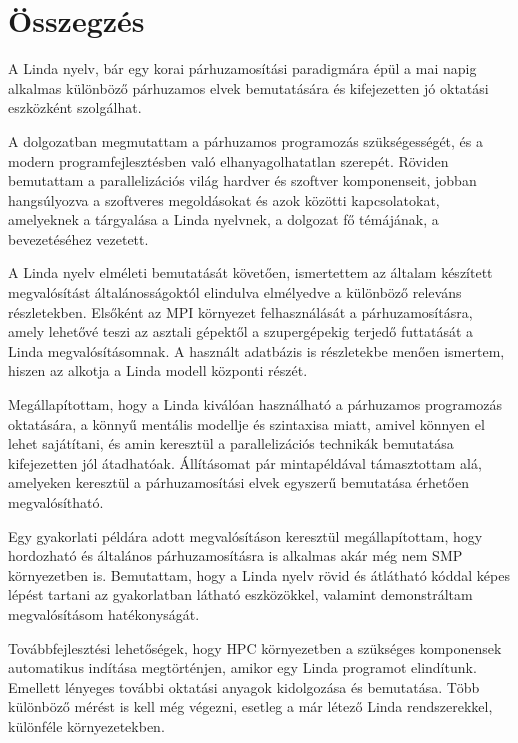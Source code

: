 
\chapter*{Összegzés}

A Linda nyelv, bár egy korai párhuzamosítási paradigmára épül a mai napig alkalmas különböző párhuzamos elvek bemutatására és kifejezetten jó oktatási eszközként szolgálhat.

A dolgozatban megmutattam a párhuzamos programozás szükségességét, és a modern programfejlesztésben való elhanyagolhatatlan szerepét.
Röviden bemutattam a parallelizációs világ hardver és szoftver komponenseit, jobban hangsúlyozva a szoftveres megoldásokat és azok közötti kapcsolatokat, amelyeknek a tárgyalása a Linda nyelvnek, a dolgozat fő témájának, a bevezetéséhez vezetett.

A Linda nyelv elméleti bemutatását követően, ismertettem az általam készített megvalósítást általánosságoktól elindulva elmélyedve a különböző releváns részletekben.
Elsőként az \ac{MPI} környezet felhasználását a párhuzamosításra, amely lehetővé teszi az asztali gépektől a szupergépekig terjedő futtatását a Linda megvalósításomnak.
A használt adatbázis is részletekbe menően ismertem, hiszen az alkotja a Linda modell központi részét.

Megállapítottam, hogy a Linda kiválóan használható a párhuzamos programozás oktatására, a könnyű mentális modellje és szintaxisa miatt, amivel könnyen el lehet sajátítani, és amin keresztül a parallelizációs technikák bemutatása kifejezetten jól átadhatóak.
Állításomat pár mintapéldával támasztottam alá, amelyeken keresztül a párhuzamosítási elvek egyszerű bemutatása érhetően megvalósítható.

Egy gyakorlati példára adott megvalósításon keresztül megállapítottam, hogy hordozható és általános párhuzamosításra is alkalmas akár még nem \ac{SMP} környezetben is.
Bemutattam, hogy a Linda nyelv rövid és átlátható kóddal képes lépést tartani az gyakorlatban látható eszközökkel, valamint demonstráltam megvalósításom hatékonyságát.

Továbbfejlesztési lehetőségek, hogy \ac{HPC} környezetben a szükséges komponensek automatikus indítása megtörténjen, amikor egy Linda programot elindítunk.
Emellett lényeges további oktatási anyagok kidolgozása és bemutatása. 
Több különböző mérést is kell még végezni, esetleg a már létező Linda rendszerekkel, különféle környezetekben.